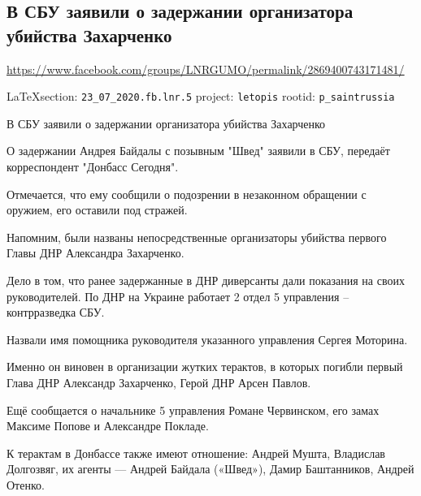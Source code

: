  
 
\subsection{В СБУ заявили о задержании организатора убийства Захарченко}
\url{https://www.facebook.com/groups/LNRGUMO/permalink/2869400743171481/}

  
\vspace{0.5cm}
{\small\LaTeX section: \verb|23_07_2020.fb.lnr.5| project: \verb|letopis| rootid: \verb|p_saintrussia|}
\vspace{0.5cm}
 
В СБУ заявили о задержании организатора убийства Захарченко

О задержании Андрея Байдалы с позывным "Швед" заявили в СБУ, передаёт
корреспондент "Донбасс Сегодня".

Отмечается, что ему сообщили о подозрении в незаконном обращении с оружием, его
оставили под стражей.

Напомним, были названы непосредственные организаторы убийства первого Главы ДНР
Александра Захарченко.

Дело в том, что ранее задержанные в ДНР диверсанты дали показания на своих
руководителей.  По ДНР на Украине работает 2 отдел 5 управления – контрразведка
СБУ.

Назвали имя помощника руководителя указанного управления Сергея Моторина.

Именно он виновен в организации жутких терактов, в которых погибли первый Глава
ДНР Александр Захарченко, Герой ДНР Арсен Павлов.

Ещё сообщается о начальнике 5 управления Романе Червинском, его замах Максиме
Попове и Александре Покладе.

К терактам в Донбассе также имеют отношение: Андрей Мушта, Владислав Долгозвяг,
их агенты — Андрей Байдала («Швед»), Дамир Баштанников, Андрей Отенко.
